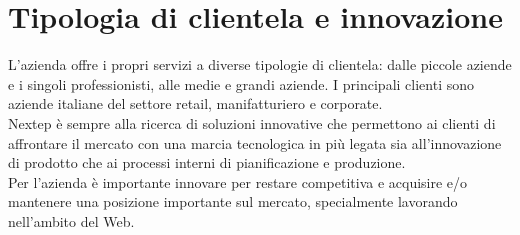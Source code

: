 \newpage
\section{Tipologia di clientela e innovazione}
L'azienda offre i propri servizi a diverse tipologie di clientela: dalle piccole aziende e i singoli professionisti, alle medie e grandi aziende. I principali clienti sono aziende italiane del settore retail, manifatturiero e corporate.\\
Nextep è sempre alla ricerca di soluzioni innovative che permettono ai clienti di affrontare il mercato con una marcia tecnologica in più legata sia all'innovazione di prodotto che ai processi interni di pianificazione e produzione. \\
Per l'azienda è importante innovare per restare competitiva e acquisire e/o mantenere una posizione importante sul mercato, specialmente lavorando nell'ambito del Web.